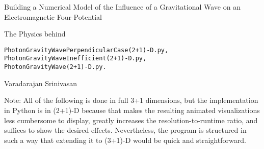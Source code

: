 \documentclass{article}
\begin{document}
\begin{flushleft}
{\large Building a Numerical Model of the Influence of a Gravitational Wave on an Electromagnetic Four-Potential}
\end{flushleft}
The Physics behind
\vspace{-2ex}
\begin{verbatim}
PhotonGravityWavePerpendicularCase(2+1)-D.py,
PhotonGravityWaveInefficient(2+1)-D.py,
PhotonGravityWave(2+1)-D.py.
\end{verbatim}
\begin{flushright}
\bigskip
Varadarajan Srinivasan
\end{flushright}
\setlength{\rightskip}{1cm}
\setlength{\leftskip}{1cm}
Note: All of the following is done in full 3+1 dimensions, but the implementation in Python is in (2+1)-D because that makes the resulting animated visualizations less cumbersome to display, greatly increases the resolution-to-runtime ratio, and suffices to show the desired effects. Nevertheless, the program is structured in such a way that extending it to (3+1)-D would be quick and straightforward.

\setlength{\leftskip}{0pt}
\setlength{\rightskip}{0pt}

\bigskip
\end{document}
